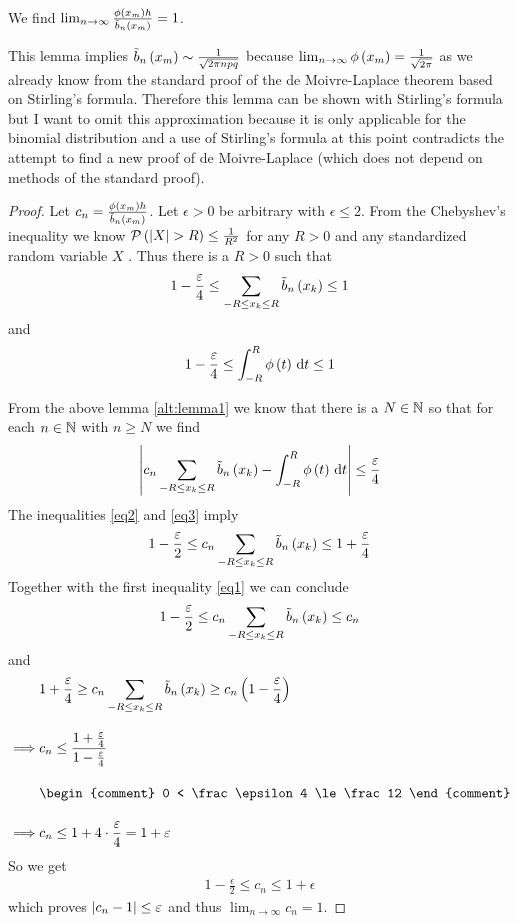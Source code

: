 \begin{lemma}
  We find $\lim_{n\to\infty} \frac{\fphi{\xnp}h}{\bnp} = 1$.
\end{lemma}

\begin{remark}
  This lemma implies $\bnp \sim \frac{1}{\sqrt{2\pi npq}}$ because $\lim_{n\to\infty} \fphi{\xnp} = \frac1{\sqrt{2\pi}}$ as we already know from the standard proof of the de Moivre-Laplace theorem based on Stirling's formula. Therefore this lemma can be shown with Stirling's formula but I want to omit this approximation because it is only applicable for the binomial distribution and a use of Stirling's formula at this point contradicts the attempt to find a new proof of de Moivre-Laplace (which does not depend on methods of the standard proof).
\end{remark}

\begin{proof}
  Let $c_n = \frac{\fphi{\xnp}h}{\bnp}$. Let $\epsilon > 0$ be arbitrary with $\epsilon \le 2$. From the Chebyshev's inequality we know $\P{\abs{X}> R} \le \frac{1}{R^2}$ for any $R > 0$ and any standardized random variable $X$ \cite{wiki:chebyshev}. Thus there is a $R >0$ such that
  \begin{align}\label{eq1}
    1 -\frac{\epsilon}4 \le \sum_{-R \le \x \le R} \bb{\x[k]} \le 1
  \end{align}
  and
  \begin{align}\label{eq2}
    1-\frac{\epsilon}4 \le \int_{-R}^R \fphi{t}\d{t} \le 1
  \end{align}

  From the above lemma \ref{alt:lemma1} we know that there is a $N\in\N$ so that for each $n\in\N$ with $n\ge N$ we find
  \begin{align} \label{eq3}
    \abs{c_n \sum_{-R\le\x\le R}\bb{\x} - \int_{-R}^R \fphi{t}\d{t}} \le \frac{\epsilon}4
  \end{align}
  The inequalities \eqref{eq2} and \eqref{eq3} imply
  \begin{align}
    1-\frac{\epsilon}2 \le c_n \sum_{-R \le \x \le R} \bb{\x} \le 1+\frac{\epsilon}4
  \end{align}
  Together with the first inequality \eqref{eq1} we can conclude
  \begin{align}
    1-\frac \epsilon2 \le c_n \sum_{-R \le \x \le R} \bb{\x} \le c_n
  \end{align}
  and
  \begin{align}
    & 1+\frac \epsilon4 \ge c_n \sum_{-R \le \x \le R} \bb{\x} \ge c_n \br{1-\frac \epsilon4} \bnl
    \implies & c_n \le \frac{1+\frac \epsilon4}{1-\frac\epsilon4} \bnl
    &
    \begin{comment}
      0 < \frac \epsilon 4 \le \frac 12
    \end{comment} \bnl
    \implies & c_n \le 1+4\cdot \frac \epsilon 4 = 1+\epsilon
  \end{align}
  So we get
  \begin{align}
    1-\frac \epsilon 2 \le c_n \le 1+\epsilon
  \end{align}
  which proves $\abs{c_n-1} \le \epsilon$ and thus $\lim_{n\to\infty} c_n = 1$.
\end{proof}

